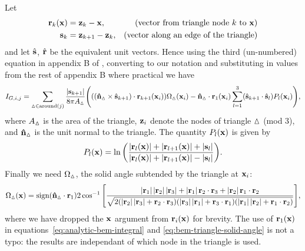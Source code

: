 Let
\begin{equation}
  \begin{aligned}
    \mathbf{r}_k(\mathbf{x}) &= \mathbf{z}_k - \mathbf{x}, &\quad \text{(vector from triangle node $k$ to $\mathbf{x}$)} \\
    {\mathbf{s}}_k &= \mathbf{z}_{k+1} - \mathbf{z}_k, & \text{(vector along an edge of the triangle)} \\
  \end{aligned}
\end{equation}
and let $\hat{{\mathbf{s}}}$, $\hat{\mathbf{r}}$ be the equivalent unit vectors.
Hence using the third (un-numbered) equation in appendix B of \cite{Lindholm1984}, converting to our notation and substituting in values from the rest of appendix B where practical we have
\begin{equation}
  \begin{aligned}
    \label{eq:analytic-bem-integral}
    I_{G,i,j} &= \sum_{\vartriangle \in \text{around}(j)} \frac{\left|{{\mathbf{s}}_{k+1}} \right|}{8 \pi A_\vartriangle} {\left( 
      {\left( (\mathbf{\hat{n}}_\vartriangle \times \hat{{\mathbf{s}}}_{k+1}) \cdot \mathbf{r}_{k+1}(\mathbf{x}_i) \right)} \Omega_\vartriangle(\mathbf{x}_i) 
      - \mathbf{\hat{n}}_\vartriangle \cdot \mathbf{r}_1(\mathbf{x}_i) \sum_{l=1}^{3} (\hat{{\mathbf{s}}}_{k+1} \cdot \hat{{\mathbf{s}}}_l) P_l(\mathbf{x}_i)
     \right)}, \\
  \end{aligned}
\end{equation} 
where $A_\vartriangle$ is the area of the triangle, $\mathbf{z}_i$ denote the nodes of triangle $\vartriangle$ (mod 3), and $\mathbf{\hat{n}}_\vartriangle$ is the unit normal to the triangle. 
The quantity $P_l(\mathbf{x})$ is given by
\begin{equation}
  P_l(\mathbf{x}) = \ln{\left( \frac{\left|{\mathbf{r}_l(\mathbf{x})} \right| + \left|{\mathbf{r}_{l+1}(\mathbf{x})} \right| + \left|{{\mathbf{s}}_l} \right|}
    {\left|{\mathbf{r}_l(\mathbf{x})} \right| + \left|{\mathbf{r}_{l+1}(\mathbf{x})} \right| - \left|{{\mathbf{s}}_l} \right|} \right)}.
\end{equation}
Finally we need $\Omega_\vartriangle$, the solid angle subtended by the triangle at $\mathbf{x}_i$:
\begin{equation}
  \label{eq:bem-triangle-solid-angle}
  \Omega_\vartriangle(\mathbf{x}) = \text{sign}(\mathbf{\hat{n}}_\vartriangle \cdot \mathbf{r}_1) 2 \cos^{-1}{\left[ \frac
    {\left|{\mathbf{r}_1} \right|\left|{\mathbf{r}_2} \right|\left|{\mathbf{r}_3} \right| + \left|{\mathbf{r}_1} \right| \mathbf{r}_2\cdot\mathbf{r}_3 + \left|{\mathbf{r}_2} \right|\mathbf{r}_1\cdot \mathbf{r}_2}
    {\sqrt{2(\left|{\mathbf{r}_2} \right|\left|{\mathbf{r}_3} \right| + \mathbf{r}_2\cdot\mathbf{r}_3)
        (\left|{\mathbf{r}_3} \right|\left|{\mathbf{r}_1} \right| + \mathbf{r}_3\cdot\mathbf{r}_1)
        (\left|{\mathbf{r}_1} \right|\left|{\mathbf{r}_2} \right| + \mathbf{r}_1\cdot\mathbf{r}_2)}} \right]},
\end{equation}
where we have dropped the $\mathbf{x}$ argument from $\mathbf{r}_i(\mathbf{x})$ for brevity.
The use of $\mathbf{r}_1(\mathbf{x})$ in equations~\eqref{eq:analytic-bem-integral} and \eqref{eq:bem-triangle-solid-angle} is not a typo: the results are independant of which node in the triangle is used.


